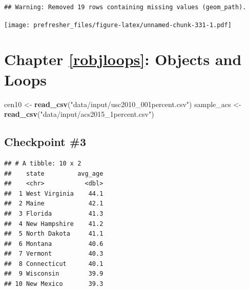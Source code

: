 \documentclass[]{book}
\newenvironment{Shaded}{\begin{snugshade}}{\end{snugshade}}
\newcommand{\DataTypeTok}[1]{\textcolor[rgb]{0.13,0.29,0.53}{#1}}
\newcommand{\DecValTok}[1]{\textcolor[rgb]{0.00,0.00,0.81}{#1}}
\newcommand{\KeywordTok}[1]{\textcolor[rgb]{0.13,0.29,0.53}{\textbf{#1}}}
\newcommand{\NormalTok}[1]{#1}
\newcommand{\OperatorTok}[1]{\textcolor[rgb]{0.81,0.36,0.00}{\textbf{#1}}}
\newcommand{\StringTok}[1]{\textcolor[rgb]{0.31,0.60,0.02}{#1}}
\theoremstyle{definition}
\theoremstyle{definition}
\theoremstyle{definition}
\theoremstyle{remark}
\begin{document}
\begin{verbatim}
## Warning: Removed 19 rows containing missing values (geom_path).
\end{verbatim}

\texttt{[image: prefresher\_files/figure-latex/unnamed-chunk-331-1.pdf]}

\hypertarget{chapter-refrobjloops-objects-and-loops}{%
\section{Chapter \ref{robjloops}: Objects and Loops}\label{chapter-refrobjloops-objects-and-loops}}

\begin{Shaded}
\begin{Highlighting}[]
\NormalTok{cen10 <-}\StringTok{ }\KeywordTok{read_csv}\NormalTok{(}\StringTok{"data/input/usc2010_001percent.csv"}\NormalTok{)}
\NormalTok{sample_acs <-}\StringTok{ }\KeywordTok{read_csv}\NormalTok{(}\StringTok{"data/input/acs2015_1percent.csv"}\NormalTok{)}
\end{Highlighting}
\end{Shaded}

\hypertarget{checkpoint-3}{%
\subsection*{Checkpoint \#3}\label{checkpoint-3}}

\begin{Shaded}
\end{Shaded}

\begin{verbatim}
## # A tibble: 10 x 2
##    state         avg_age
##    <chr>           <dbl>
##  1 West Virginia    44.1
##  2 Maine            42.1
##  3 Florida          41.3
##  4 New Hampshire    41.2
##  5 North Dakota     41.1
##  6 Montana          40.6
##  7 Vermont          40.3
##  8 Connecticut      40.1
##  9 Wisconsin        39.9
## 10 New Mexico       39.3
\end{verbatim}
\end{document}
